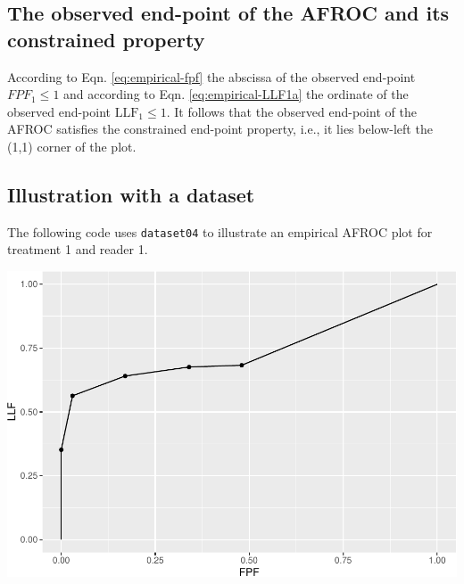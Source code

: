 \documentclass[
]{book}
\newenvironment{Shaded}{\begin{snugshade}}{\end{snugshade}}
\newcommand{\DataTypeTok}[1]{\textcolor[rgb]{0.13,0.29,0.53}{#1}}
\newcommand{\DecValTok}[1]{\textcolor[rgb]{0.00,0.00,0.81}{#1}}
\newcommand{\KeywordTok}[1]{\textcolor[rgb]{0.13,0.29,0.53}{\textbf{#1}}}
\newcommand{\NormalTok}[1]{#1}
\newcommand{\OperatorTok}[1]{\textcolor[rgb]{0.81,0.36,0.00}{\textbf{#1}}}
\newcommand{\StringTok}[1]{\textcolor[rgb]{0.31,0.60,0.02}{#1}}
\begin{document}
\hypertarget{empirical-AFROC-constrained}{%
\subsection{The observed end-point of the AFROC and its constrained property}\label{empirical-AFROC-constrained}}

According to Eqn. \eqref{eq:empirical-fpf} the abscissa of the observed end-point \(FPF_1 \leq 1\) and according to Eqn. \eqref{eq:empirical-LLF1a} the ordinate of the observed end-point \(\text{LLF}_1 \leq 1\). It follows that the observed end-point of the AFROC satisfies the constrained end-point property, i.e., it lies below-left the (1,1) corner of the plot.

\hypertarget{empirical-afroc-plot-illustration}{%
\subsection{Illustration with a dataset}\label{empirical-afroc-plot-illustration}}

The following code uses \texttt{dataset04} to illustrate an empirical AFROC plot for treatment 1 and reader 1.

\begin{Shaded}
\end{Shaded}

\includegraphics{03-empirical_files/figure-latex/unnamed-chunk-7-1.pdf}
\end{document}
